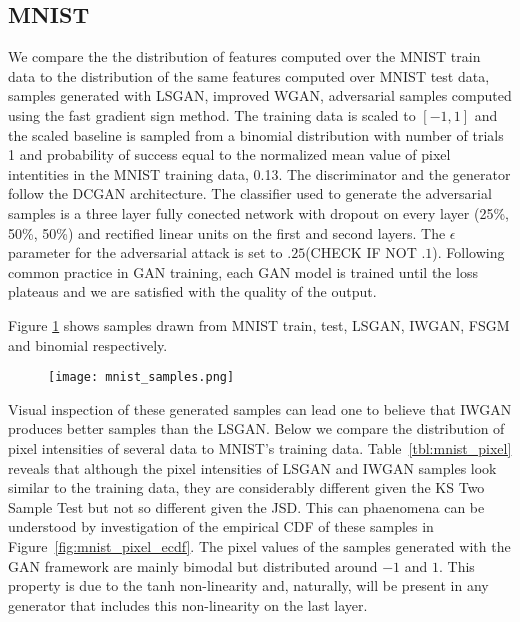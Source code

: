 \subsection{MNIST}
We compare the the distribution of features computed over the MNIST train data
to the distribution of the same features computed over MNIST test data, samples
generated with LSGAN, improved WGAN, adversarial samples computed using the fast gradient
sign method. The training data is scaled to $[-1, 1]$ and the scaled baseline is sampled from a binomial distribution with number of trials 1
and probability of success equal to the normalized mean value of pixel intentities in the
MNIST training data, 0.13. The discriminator and the generator follow the DCGAN architecture.
The classifier used to generate the adversarial samples is a three layer fully
conected network with dropout on every layer (25\%, 50\%, 50\%) and rectified
linear units on the first and second layers. The $\epsilon$ parameter for the
adversarial attack is set to $.25$(CHECK IF NOT $.1$). 
Following common practice in GAN training, each GAN model is trained until the
loss plateaus and we are satisfied with the quality of the output.  

Figure \ref{fig:mnist_samples} shows samples drawn from MNIST train, test,
LSGAN, IWGAN, FSGM and binomial respectively. 
\begin{figure}[!h]
  \texttt{[image: mnist\_samples.png]}
  \caption{}
  \label{fig:mnist_samples}
\end{figure}

Visual inspection of these generated samples can lead one to believe that IWGAN
produces better samples than the LSGAN. Below we compare the distribution of
pixel intensities of several data to MNIST's training data. 
Table~\ref{tbl:mnist_pixel} reveals that although the pixel intensities of LSGAN
and IWGAN samples look similar to the training data, they are considerably
different given the KS Two Sample Test but not so different given the JSD. This
can phaenomena can be understood by investigation of the empirical CDF of these
samples in Figure~\ref{fig:mnist_pixel_ecdf}. The pixel values of the samples
generated with the GAN framework are mainly bimodal but distributed around $-1$
and $1$. This property is due to the tanh non-linearity and, naturally, will be
present in any generator that includes this non-linearity on the last layer.

